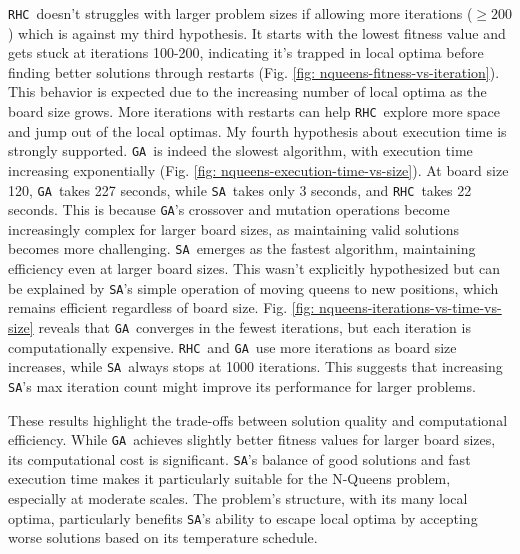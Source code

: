 \documentclass[conference]{IEEEtran}
\newcommand{\sa}{\texttt{SA}}
\newcommand{\ga}{\texttt{GA}}
\newcommand{\rhc}{\texttt{RHC}}
\begin{document}
\rhc\ doesn't struggles with larger problem sizes if allowing more iterations ($\geq 200$) which is against my third hypothesis. It starts with the lowest fitness value and gets stuck at iterations 100-200, indicating it's trapped in local optima before finding better solutions through restarts (Fig. \ref{fig: nqueens-fitness-vs-iteration}). This behavior is expected due to the increasing number of local optima as the board size grows. More iterations with restarts can help \rhc\ explore more space and jump out of the local optimas.
My fourth hypothesis about execution time is strongly supported. \ga\ is indeed the slowest algorithm, with execution time increasing exponentially (Fig.  \ref{fig: nqueens-execution-time-vs-size}). At board size 120, \ga\ takes 227 seconds, while \sa\ takes only 3 seconds, and \rhc\ takes 22 seconds. This is because \ga's crossover and mutation operations become increasingly complex for larger board sizes, as maintaining valid solutions becomes more challenging. \sa\ emerges as the fastest algorithm, maintaining efficiency even at larger board sizes. This wasn't explicitly hypothesized but can be explained by \sa's simple operation of moving queens to new positions, which remains efficient regardless of board size.
Fig. \ref{fig: nqueens-iterations-vs-time-vs-size} reveals that \ga\ converges in the fewest iterations, but each iteration is computationally expensive. \rhc\ and \ga\ use more iterations as board size increases, while \sa\ always stops at 1000 iterations. This suggests that increasing \sa's max iteration count might improve its performance for larger problems.

These results highlight the trade-offs between solution quality and computational efficiency. While \ga\ achieves slightly better fitness values for larger board sizes, its computational cost is significant. \sa's balance of good solutions and fast execution time makes it particularly suitable for the N-Queens problem, especially at moderate scales. The problem's structure, with its many local optima, particularly benefits \sa's ability to escape local optima by accepting worse solutions based on its temperature schedule.
\end{document}
